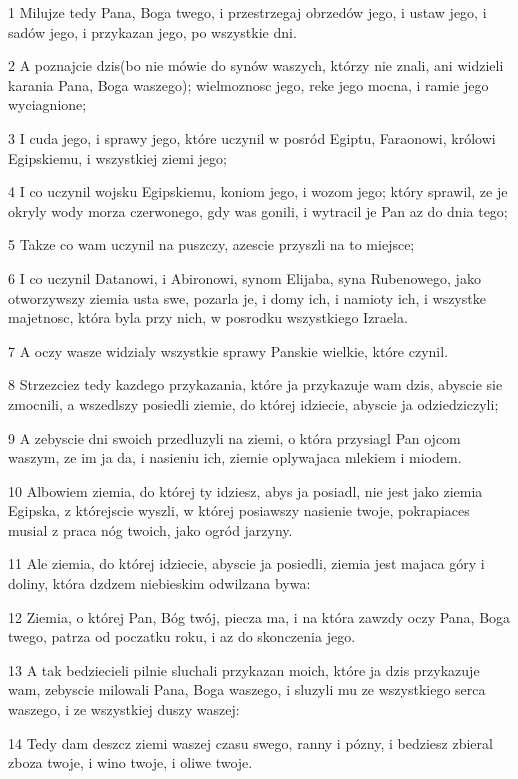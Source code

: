 \par 1 Milujze tedy Pana, Boga twego, i przestrzegaj obrzedów jego, i ustaw jego, i sadów jego, i przykazan jego, po wszystkie dni.
\par 2 A poznajcie dzis(bo nie mówie do synów waszych, którzy nie znali, ani widzieli karania Pana, Boga waszego); wielmoznosc jego, reke jego mocna, i ramie jego wyciagnione;
\par 3 I cuda jego, i sprawy jego, które uczynil w posród Egiptu, Faraonowi, królowi Egipskiemu, i wszystkiej ziemi jego;
\par 4 I co uczynil wojsku Egipskiemu, koniom jego, i wozom jego; który sprawil, ze je okryly wody morza czerwonego, gdy was gonili, i wytracil je Pan az do dnia tego;
\par 5 Takze co wam uczynil na puszczy, azescie przyszli na to miejsce;
\par 6 I co uczynil Datanowi, i Abironowi, synom Elijaba, syna Rubenowego, jako otworzywszy ziemia usta swe, pozarla je, i domy ich, i namioty ich, i wszystke majetnosc, która byla przy nich, w posrodku wszystkiego Izraela.
\par 7 A oczy wasze widzialy wszystkie sprawy Panskie wielkie, które czynil.
\par 8 Strzezciez tedy kazdego przykazania, które ja przykazuje wam dzis, abyscie sie zmocnili, a wszedlszy posiedli ziemie, do której idziecie, abyscie ja odziedziczyli;
\par 9 A zebyscie dni swoich przedluzyli na ziemi, o która przysiagl Pan ojcom waszym, ze im ja da, i nasieniu ich, ziemie oplywajaca mlekiem i miodem.
\par 10 Albowiem ziemia, do której ty idziesz, abys ja posiadl, nie jest jako ziemia Egipska, z którejscie wyszli, w której posiawszy nasienie twoje, pokrapiaces musial z praca nóg twoich, jako ogród jarzyny.
\par 11 Ale ziemia, do której idziecie, abyscie ja posiedli, ziemia jest majaca góry i doliny, która dzdzem niebieskim odwilzana bywa:
\par 12 Ziemia, o której Pan, Bóg twój, piecza ma, i na która zawzdy oczy Pana, Boga twego, patrza od poczatku roku, i az do skonczenia jego.
\par 13 A tak bedziecieli pilnie sluchali przykazan moich, które ja dzis przykazuje wam, zebyscie milowali Pana, Boga waszego, i sluzyli mu ze wszystkiego serca waszego, i ze wszystkiej duszy waszej:
\par 14 Tedy dam deszcz ziemi waszej czasu swego, ranny i pózny, i bedziesz zbieral zboza twoje, i wino twoje, i oliwe twoje.
